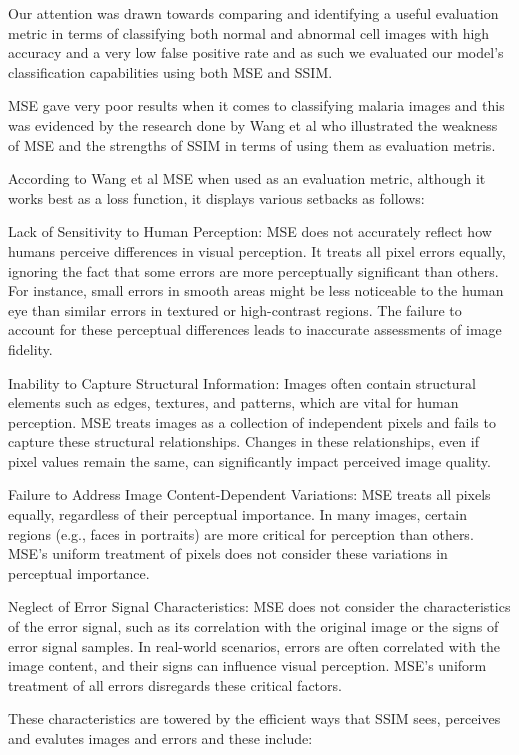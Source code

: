 \documentclass[journal,12pt,onecolumn,draftcls]{IEEEtran}
\begin{document}
Our attention was drawn towards comparing and identifying a useful evaluation metric in terms of classifying both normal and abnormal cell images with high accuracy and a very low false positive rate and as such we evaluated our model's classification capabilities using both MSE and SSIM.

MSE gave very poor results when it comes to classifying malaria images and this was evidenced by the research done by Wang et al \cite{wang2009} who illustrated the weakness of MSE and the strengths of SSIM in terms of using them as evaluation metris.

According to Wang et al \cite{wang2009} MSE when used as an evaluation metric, although it works best as a loss function, it displays various setbacks as follows:

Lack of Sensitivity to Human Perception: MSE does not accurately reflect how humans perceive differences in visual perception. It treats all pixel errors equally, ignoring the fact that some errors are more perceptually significant than others. For instance, small errors in smooth areas might be less noticeable to the human eye than similar errors in textured or high-contrast regions. The failure to account for these perceptual differences leads to inaccurate assessments of image fidelity.

Inability to Capture Structural Information: Images often contain structural elements such as edges, textures, and patterns, which are vital for human perception. MSE treats images as a collection of independent pixels and fails to capture these structural relationships. Changes in these relationships, even if pixel values remain the same, can significantly impact perceived image quality.

Failure to Address Image Content-Dependent Variations: MSE treats all pixels equally, regardless of their perceptual importance. In many images, certain regions (e.g., faces in portraits) are more critical for perception than others. MSE's uniform treatment of pixels does not consider these variations in perceptual importance.

Neglect of Error Signal Characteristics: MSE does not consider the characteristics of the error signal, such as its correlation with the original image or the signs of error signal samples. In real-world scenarios, errors are often correlated with the image content, and their signs can influence visual perception. MSE's uniform treatment of all errors disregards these critical factors.

These characteristics are towered by the efficient ways that SSIM sees, perceives and evalutes images and errors and these include:
\end{document}
